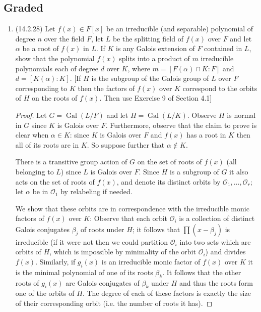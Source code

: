 \documentclass[11pt]{article}
\DeclareMathOperator{\Gal}{Gal}
\begin{document}
\subsection*{Graded}
\begin{enumerate}
    \item (14.2.28) Let $f(x)\in F[x]$ be an irreducible (and separable) polynomial of degree $n$ over the field $F$, let $L$ be the splitting field of $f(x)$ over $F$ and let $\alpha$ be a root of $f(x)$ in $L$. If $K$ is any Galois extension of $F$ contained in $L$, show that the polynomial $f(x)$ splits into a product of $m$ irreducible polynomials each of degree $d$ over $K$, where $m = [F(\alpha)\cap K\colon F]$ and $d = [K(\alpha)\colon K]$. [If $H$ is the subgroup of the Galois group of $L$ over $F$ corresponding to $K$ then the factors of $f(x)$ over $K$ correspond to the orbits of $H$ on the roots of $f(x)$. Then use Exercise 9 of Section 4.1] \begin{proof}
        Let $G = \Gal(L/F)$ and let $H = \Gal(L/K)$. Observe $H$ is normal in $G$ since $K$ is Galois over $F$. Furthermore, observe that the claim to prove is clear when $\alpha\in K$: since $K$ is Galois over $F$ and $f(x)$ has a root in $K$ then all of its roots are in $K$. So suppose further that $\alpha\not\in K$.
        
        There is a transitive group action of $G$ on the set of roots of $f(x)$ (all belonging to $L$) since $L$ is Galois over $F$. Since $H$ is a subgroup of $G$ it also acts on the set of roots of $f(x)$, and denote its distinct orbits by $\mathcal{O}_1,\dots,\mathcal{O}_r$; let $\alpha$ be in $\mathcal{O}_1$ by relabeling if needed.

        We show that these orbits are in correspondence with the irreducible monic factors of $f(x)$ over $K$: Observe that each orbit $\mathcal{O}_i$ is a collection of distinct Galois conjugates $\beta_j$ of roots under $H$; it follows that $\prod (x-\beta_j)$ is irreducible (if it were not then we could partition $\mathcal{O}_i$ into two sets which are orbits of $H$, which is impossible by minimality of the orbit $\mathcal{O}_i$) and divides $f(x)$. Similarly, if $g_i(x)$ is an irreducible monic factor of $f(x)$ over $K$ it is the minimal polynomial of one of its roots $\beta_k$. It follows that the other roots of $g_i(x)$ are Galois conjugates of $\beta_k$ under $H$ and thus the roots form one of the orbits of $H$. The degree of each of these factors is exactly the size of their corresponding orbit (i.e. the number of roots it has).


\end{proof}
\end{enumerate}
\end{document}

